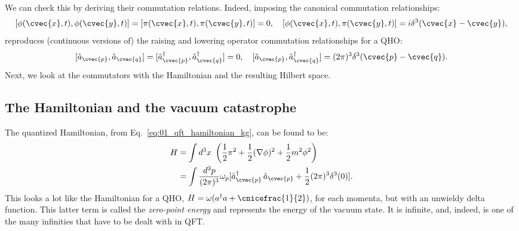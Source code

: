 We can check this by deriving their commutation relations.
Indeed, imposing the canonical commutation relationships:
\begin{equation}
	\label{eq:01_qft_quantization_fsf_commutators}
	[\phi(\cvec{x}, t), \phi(\cvec{y}, t)] = [\pi(\cvec{x}, t), \pi(\cvec{y}, t)] = 0, \quad [\phi(\cvec{x}, t), \pi(\cvec{y}, t)] = i\delta^3(\cvec{x} - \cvec{y}),
\end{equation}
reproduces (continuous versions of) the raising and lowering operator commutation relationships for a QHO:
\begin{equation}
	\label{eq:01_qft_quantization_fsf_commutators_qho}
	[\hat a_{\cvec{p}}, \hat a_{\cvec{q}}] = [\hat a^\dagger_{\cvec{p}}, \hat a^\dagger_{\cvec{q}}] = 0, \quad [\hat a_{\cvec{p}}, \hat a^\dagger_{\cvec{q}}] = (2\pi)^3\delta^3(\cvec{p} - \cvec{q}).
\end{equation}
Next, we look at the commutators with the Hamiltonian and the resulting Hilbert space.

\subsection{The Hamiltonian and the vacuum catastrophe}
\label{sec:01_qft_quantization_hamiltonian}

The quantized Hamiltonian, from Eq.~\ref{eq:01_qft_hamiltonian_kg}, can be found to be:
\begin{equation}
	\label{eq:01_qft_quantization_hamiltonian_zeropoint}
	\begin{split}
		H &= \int d^3x\ \left(\frac{1}{2}\pi^2 + \frac{1}{2}(\nabla\phi)^2 + \frac{1}{2}m^2\phi^2\right) \\
		&= \int \frac{d^3p}{(2\pi)^3} \omega_p [\hat a^\dagger_{\cvec{p}}\,\hat a_{\cvec{p}} + \frac{1}{2} (2\pi)^3\delta^3(0)].
	\end{split}
\end{equation}
This looks a lot like the Hamiltonian for a QHO, $H = \omega(a^\dagger a + \cnicefrac{1}{2})$, for each momenta, but with an unwieldy delta function.
This latter term is called the \textit{zero-point energy} and represents the energy of the vacuum state.
It is infinite, and, indeed, is one of the many infinities that have to be dealt with in QFT.

